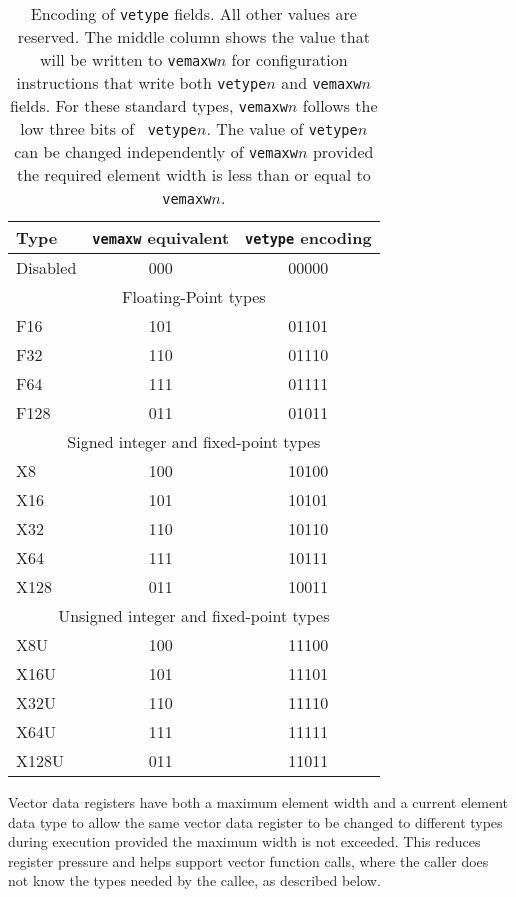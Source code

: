 \begin{table}[hbt]
  \centering
  \begin{tabular}{|l|c|c|}
    \hline
    Type & {\tt vemaxw} equivalent & {\tt vetype} encoding \\
    \hline
    Disabled & 000 & 00000 \\
    \hline
    \hline
    \multicolumn{3}{|c|}{Floating-Point types} \\
    \hline
    F16      & 101 & 01101 \\
    F32      & 110 & 01110 \\
    F64      & 111 & 01111 \\
    F128     & 011 & 01011 \\
    \hline
    \hline
    \multicolumn{3}{|c|}{Signed integer and fixed-point types} \\
    \hline
    X8       & 100 & 10100  \\
    X16      & 101 & 10101  \\
    X32      & 110 & 10110  \\
    X64      & 111 & 10111  \\
    X128     & 011 & 10011  \\
    \hline
    \hline
    \multicolumn{3}{|c|}{Unsigned integer and fixed-point types} \\
    \hline
    X8U      & 100 & 11100  \\
    X16U     & 101 & 11101  \\
    X32U     & 110 & 11110  \\
    X64U     & 111 & 11111  \\
    X128U    & 011 & 11011  \\
    \hline
  \end{tabular}
  \caption{Encoding of {\tt vetype} fields.  All other values are
    reserved. The middle column shows the value that will be written
    to {\tt vemaxw}$n$ for configuration instructions that write both
    {\tt vetype}$n$ and {\tt vemaxw}$n$ fields. For these standard
    types, {\tt vemaxw}$n$ follows the low three bits of {\tt
      vetype}$n$. The value of {\tt vetype}$n$ can be changed
    independently of {\tt vemaxw}$n$ provided the required element
    width is less than or equal to {\tt vemaxw}$n$.}
  \label{tab:vetype}
\end{table}

\begin{commentary}
  Vector data registers have both a maximum element width and a
  current element data type to allow the same vector data register to
  be changed to different types during execution provided the
  maximum width is not exceeded.  This reduces register pressure and
  helps support vector function calls, where the caller does not know
  the types needed by the callee, as described below.
\end{commentary}


